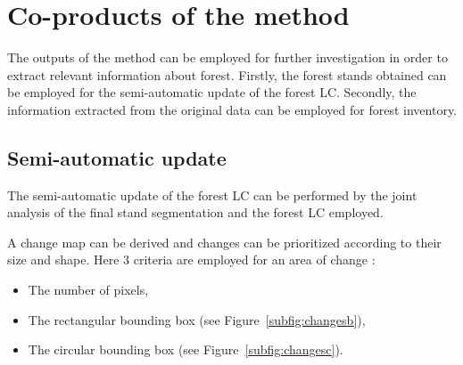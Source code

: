 \section{Co-products of the method}
The outputs of the method can be employed for further investigation in order to extract relevant information about forest. Firstly, the forest stands obtained can be employed for the semi-automatic update of the forest LC. Secondly, the information extracted from the original data can be employed for forest inventory.
\subsection{Semi-automatic update}
The semi-automatic update of the forest LC can be performed by the joint analysis of the final stand segmentation and the forest LC employed.

A change map can be derived and changes can be prioritized according to their size and shape.
Here 3 criteria are employed for an area of change :
\begin{itemize}
\item The number of pixels,
\item The rectangular bounding box (see Figure~\ref{subfig:changesb}),
\item The circular bounding box (see Figure~\ref{subfig:changesc}).
\end{itemize}

